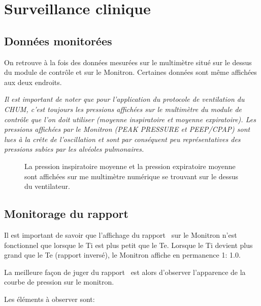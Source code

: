 \chapter{Surveillance clinique}

\section{Données monitorées}

On retrouve à la fois des données mesurées sur le multimètre situé sur
le dessus du module de contrôle et sur le Monitron. Certaines données
sont même affichées aux deux endroits.

\emph{Il est important de noter que pour l'application du protocole de
ventilation du CHUM, c'est toujours les pressions affichées sur le
multimètre du module de contrôle que l'on doit utiliser (moyenne
inspiratoire et moyenne expiratoire).  Les pressions affichées par le Monitron (PEAK PRESSURE et PEEP/CPAP)
sont lues à la crête de l'oscillation et sont par conséquent peu
représentatives des pressions subies par les alvéoles pulmonaires.
}


\begin{figure}
	
	\caption[Pressions affichées sur le multimètre numérique]{La pression inspiratoire moyenne et la pression expiratoire moyenne sont affichées sur me multimètre numérique se trouvant sur le dessus du ventilateur.}
\end{figure}

\section{Monitorage du rapport \ie}

Il est important de savoir que l'affichage du rapport \ie\ sur le
Monitron n'est fonctionnel que lorsque le Ti est plus petit que le Te.
Lorsque le Ti devient plus grand que le Te (rapport inversé), le
Monitron affiche en permanence 1\string: 1.0.

La meilleure façon de juger du rapport \ie\ est alors d'observer
l'apparence de la courbe de pression sur le monitron.

Les éléments à observer sont:

